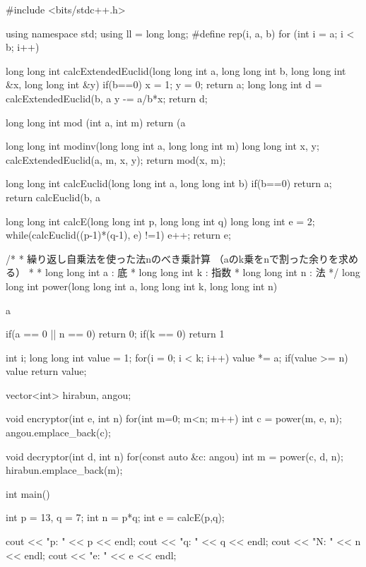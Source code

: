\documentclass[xelatex, 11pt, a4paper, ja=standard]{bxjsarticle}
\begin{document}
\begin{mylisting}[language=c++,caption=演習課題3のソースコード]
    #include <bits/stdc++.h>

using namespace std;
using ll = long long;
#define rep(i, a, b) for (int i = a; i < b; i++)

long long int calcExtendedEuclid(long long int a, long long int b,
                            long long int &x, long long int &y){  
    if(b==0){
        x = 1;
        y = 0;
        return a;
    }
    long long int d = calcExtendedEuclid(b, a%
    y -= a/b*x;
    return d;
}

long long int mod (int a, int m){
    return (a%
}

long long int modinv(long long int a, long long int m){
    long long int x, y;
    calcExtendedEuclid(a, m, x, y);
    return mod(x, m);
}


long long int calcEuclid(long long int a, long long int b){  
    if(b==0){
        return a;
    }
    return calcEuclid(b, a%
}

long long int calcE(long long int p, long long int q){
    long long int e = 2;
    while(calcEuclid((p-1)*(q-1), e) !=1){
        e++;
    }
    return e;
}

/*
 * 繰り返し自乗法を使った法nのべき乗計算
 （aのk乗をnで割った余りを求める）
 * 
 * long long int a : 底
 * long long int k : 指数
 * long long int n : 法
*/
long long int power(long long int a, long long int k, 
                                            long long int n) {

    a %

    if(a == 0 || n == 0){
        return 0;
    }
    if(k == 0){
        return 1 %
    }

    int i;
    long long int value = 1;
    for(i = 0; i < k; i++) {
        value *= a;
        if(value >= n) {
            value %
        }
    }
    return value;
}


vector<int> hirabun, angou;

void encryptor(int e, int n){
    for(int m=0; m<n; m++){
        int c = power(m, e, n);
        angou.emplace_back(c);
    }
}

void decryptor(int d, int n){
    for(const auto &c: angou){
        int m = power(c, d, n);
        hirabun.emplace_back(m);
    }
}


int main(){
    int p = 13, q = 7;
    int n = p*q;
    int e = calcE(p,q);

    cout << "p: " << p << endl;
    cout << "q: " << q << endl;
    cout << "N: " << n << endl;
    cout << "e: " << e << endl;

}
\end{mylisting}
\end{document}
